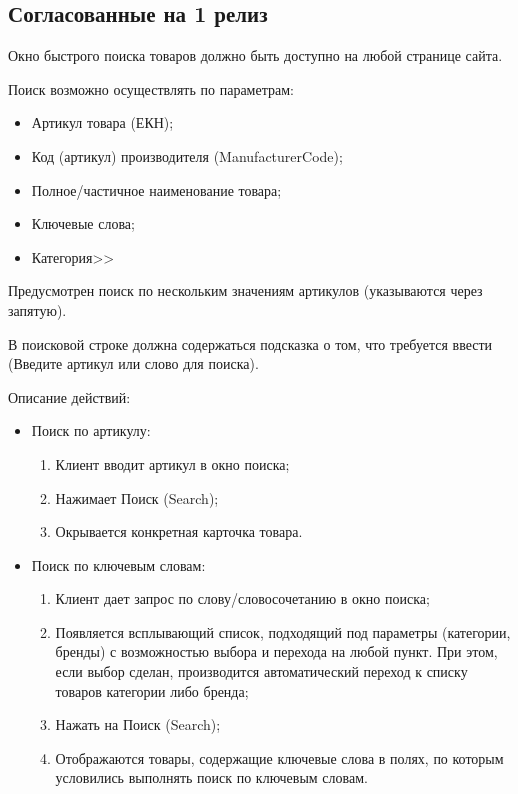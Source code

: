 \subsection{Согласованные на 1 релиз}
\fi
{}
{


\begin{wikilong}
Окно быстрого поиска товаров должно быть доступно на любой странице сайта.

Поиск возможно осуществлять по параметрам:
\begin{itemize}
	\item Артикул товара (ЕКН);
	\item Код (артикул) производителя (ManufacturerCode);	
	\item Полное/частичное наименование товара;
	\item Ключевые слова;
	\item Категория>>
\end{itemize}

Предусмотрен поиск по нескольким значениям артикулов (указываются через запятую).

В поисковой строке должна содержаться подсказка о том, что требуется ввести (Введите артикул или слово для поиска).

Описание действий:
\begin{itemize}

\item Поиск по артикулу:
	\begin{enumerate} 
		\item Клиент вводит артикул в окно поиска;
		\item Нажимает Поиск (Search);
		\item Окрывается конкретная карточка товара.
	\end{enumerate}	
	
\item Поиск по ключевым словам:
 	\begin{enumerate} 
	 	\item Клиент дает запрос по слову/словосочетанию в окно поиска;
		\item Появляется всплывающий список, подходящий под параметры (категории, бренды) с возможностью выбора и перехода на любой пункт. При этом, если выбор сделан, производится автоматический переход к списку товаров категории либо бренда;
		\item Нажать на Поиск (Search);
		\item Отображаются товары, содержащие ключевые слова в полях, по которым условились выполнять поиск по ключевым словам.
	\end{enumerate}
	

\end{itemize}
\end{wikilong}}
